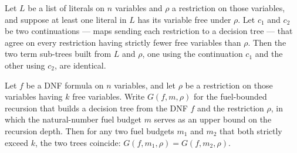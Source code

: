 \begin{lemma}
\label{SwitchingLemma.termSubTree_cont_congr_strict}
\leanok
{}
Let $L$ be a list of literals on $n$ variables and $\rho$ a restriction on those
variables, and suppose at least one literal in $L$ has its variable free under $\rho$.
Let $c_1$ and $c_2$ be two continuations — maps sending each restriction to a decision
tree — that agree on every restriction having strictly fewer free variables than $\rho$.
Then the two term sub-trees built from $L$ and $\rho$, one using the continuation $c_1$
and the other using $c_2$, are identical.
\end{lemma}

\begin{lemma}
\label{SwitchingLemma.canonicalDTree_go_fuel_invariant}
\leanok
{}
Let $f$ be a DNF formula on $n$ variables, and let $\rho$ be a restriction on those
variables having $k$ free variables. Write $G(f, m, \rho)$ for the fuel-bounded
recursion that builds a decision tree from the DNF $f$ and the restriction $\rho$, in
which the natural-number fuel budget $m$ serves as an upper bound on the recursion
depth. Then for any two fuel budgets $m_1$ and $m_2$ that both strictly exceed $k$, the
two trees coincide: $G(f, m_1, \rho) = G(f, m_2, \rho)$.
\end{lemma}

